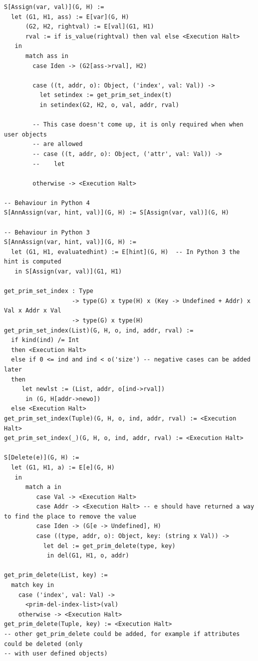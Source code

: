 \documentclass[
11pt, %
english, %
singlespacing, %
headsepline, %
]{MastersDoctoralThesis} %
\begin{document}
\begin{verbatim}
S[Assign(var, val)](G, H) :=
  let (G1, H1, ass) := E[var](G, H)
      (G2, H2, rightval) := E[val](G1, H1)
      rval := if is_value(rightval) then val else <Execution Halt>
   in
      match ass in
        case Iden -> (G2[ass->rval], H2)

        case ((t, addr, o): Object, ('index', val: Val)) ->
          let setindex := get_prim_set_index(t)
          in setindex(G2, H2, o, val, addr, rval)

        -- This case doesn't come up, it is only required when when user objects
        -- are allowed
        -- case ((t, addr, o): Object, ('attr', val: Val)) ->
        --    let

        otherwise -> <Execution Halt>

-- Behaviour in Python 4
S[AnnAssign(var, hint, val)](G, H) := S[Assign(var, val)](G, H)

-- Behaviour in Python 3
S[AnnAssign(var, hint, val)](G, H) :=
  let (G1, H1, evaluatedhint) := E[hint](G, H)  -- In Python 3 the hint is computed
   in S[Assign(var, val)](G1, H1)

get_prim_set_index : Type
                   -> type(G) x type(H) x (Key -> Undefined + Addr) x Val x Addr x Val
                   -> type(G) x type(H)
get_prim_set_index(List)(G, H, o, ind, addr, rval) :=
  if kind(ind) /= Int
  then <Execution Halt>
  else if 0 <= ind and ind < o('size') -- negative cases can be added later
  then
     let newlst := (List, addr, o[ind->rval])
      in (G, H[addr->newo])
  else <Execution Halt>
get_prim_set_index(Tuple)(G, H, o, ind, addr, rval) := <Execution Halt>
get_prim_set_index(_)(G, H, o, ind, addr, rval) := <Execution Halt>

S[Delete(e)](G, H) :=
  let (G1, H1, a) := E[e](G, H)
   in
      match a in
         case Val -> <Execution Halt>
         case Addr -> <Execution Halt> -- e should have returned a way to find the place to remove the value
         case Iden -> (G[e -> Undefined], H)
         case ((type, addr, o): Object, key: (string x Val)) ->
           let del := get_prim_delete(type, key)
            in del(G1, H1, o, addr)

get_prim_delete(List, key) :=
  match key in
    case ('index', val: Val) ->
      <prim-del-index-list>(val)
    otherwise -> <Execution Halt>
get_prim_delete(Tuple, key) := <Execution Halt>
-- other get_prim_delete could be added, for example if attributes could be deleted (only
-- with user defined objects)


\end{verbatim}
\end{document}

